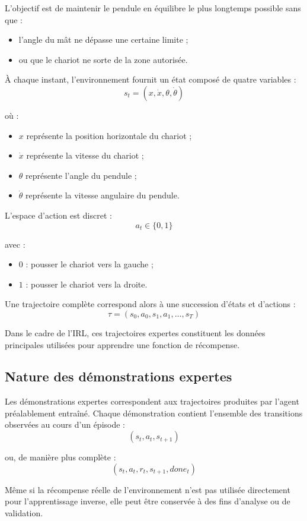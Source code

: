 \documentclass{article}
\begin{document}
L’objectif est de maintenir le pendule en équilibre le plus longtemps possible sans que :
\begin{itemize}
    \item l’angle du mât ne dépasse une certaine limite ;
    \item ou que le chariot ne sorte de la zone autorisée.
\end{itemize}

À chaque instant, l’environnement fournit un état composé de quatre variables :
\[
s_t = (x,\dot{x},\theta,\dot{\theta})
\]

où :
\begin{itemize}
    \item \(x\) représente la position horizontale du chariot ;
    \item \(\dot{x}\) représente la vitesse du chariot ;
    \item \(\theta\) représente l’angle du pendule ;
    \item \(\dot{\theta}\) représente la vitesse angulaire du pendule.
\end{itemize}

L’espace d’action est discret :
\[
a_t \in \{0,1\}
\]

avec :
\begin{itemize}
    \item \(0\) : pousser le chariot vers la gauche ;
    \item \(1\) : pousser le chariot vers la droite.
\end{itemize}

Une trajectoire complète correspond alors à une succession d’états et d’actions :
\[
\tau = (s_0,a_0,s_1,a_1,\dots,s_T)
\]

Dans le cadre de l’IRL, ces trajectoires expertes constituent les données principales utilisées pour apprendre une fonction de récompense.

\subsection{Nature des démonstrations expertes}

Les démonstrations expertes correspondent aux trajectoires produites par l’agent préalablement entraîné. Chaque démonstration contient l’ensemble des transitions observées au cours d’un épisode :
\[
(s_t,a_t,s_{t+1})
\]

ou, de manière plus complète :
\[
(s_t,a_t,r_t,s_{t+1},done_t)
\]

Même si la récompense réelle de l’environnement n’est pas utilisée directement pour l’apprentissage inverse, elle peut être conservée à des fins d’analyse ou de validation.
\end{document}
